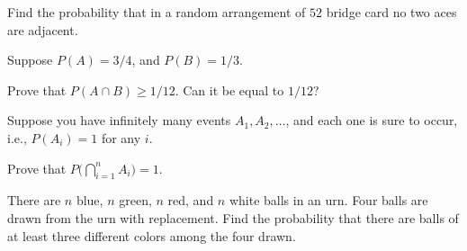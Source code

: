 \begin{problem}
  Find the probability that in a random arrangement of \(52\) bridge card
  no two aces are adjacent.
\end{problem}
\begin{solution}

\end{solution}
\newpage

\begin{problem}
  Suppose \(P(A)=3/4\), and \(P(B)=1/3\).

  Prove that \(P(A\cap B)\geq 1/12\). Can it be equal to \(1/12\)?
\end{problem}
\begin{solution}

\end{solution}
\newpage

\begin{problem}
  Suppose you have infinitely many events \(A_1,A_2,\dotsc\), and each one
  is sure to occur, i.e., \(P(A_i)=1\) for any \(i\).

  Prove that \(P\bigl(\bigcap_{i=1}^n A_i\bigr)=1\).
\end{problem}
\begin{solution}

\end{solution}
\newpage

\begin{problem}
  There are \(n\) blue, \(n\) green, \(n\) red, and \(n\) white balls in an
  urn. Four balls are drawn from the urn with replacement. Find the
  probability that there are balls of at least three different colors among
  the four drawn.
\end{problem}
\begin{solution}

\end{solution}

